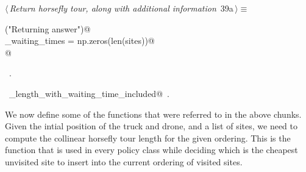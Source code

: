 \documentclass[11.5pt]{report}
\begin{document}
\vspace{-0.8cm}\newchunk 
\begin{flushleft} \small\label{scrap41}\raggedright\small
{} $\langle\,${\itshape Return horsefly tour, along with additional information}\nobreak\ {\footnotesize {39a}}$\,\rangle\equiv$
\vspace{-1ex}
\begin{list}{}{} \item
\mbox{}\verb@debug("Returning answer")@\\
\mbox{}\verb@horse_waiting_times = np.zeros(len(sites))@\\
\mbox{}@\\
\mbox{}\verb@@{\NWsep}
\end{list}
\vspace{-1.5ex}
\footnotesize
\begin{list}{}{\setlength{\itemsep}{-\parsep}\setlength{\itemindent}{-\leftmargin}}
\item \NWtxtMacroRefIn\ .
\item \NWtxtIdentsUsed\nobreak\  \verb@tour_length_with_waiting_time_included@\nobreak\ .
\item{}
\end{list}
\vspace{4ex}
\end{flushleft}
\vspace{-0.8cm}\newchunk We now define some of the functions that were referred to in the above chunks. 
Given the intial position of the truck and drone, and a list of sites, we need to compute 
the collinear horsefly tour length for the given ordering. This is the function that is 
used in every policy class while deciding which is the cheapest unvisited site to insert 
into the current ordering of visited sites. 
\end{document}
